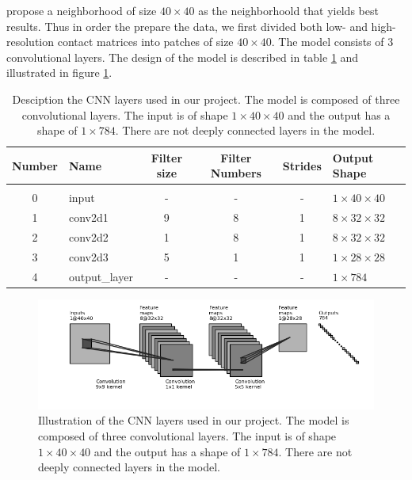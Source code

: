 \documentclass{article}
\begin{document}
propose a neighborhood of size $40 \times 40$
as the neighborhoold that yields best results.
Thus in order the prepare the data, we first
divided both low- and high-resolution contact
matrices into patches of size $40 \times 40$.
The model consists of 3 convolutional layers.
The design of the model is described in table
\ref{tab:modelDesign} and illustrated in 
figure \ref{fig:modelDesign}.
\begin{table}[]
    \centering
    \begin{tabular}{clcccl}
        Number   & Name           & Filter size & Filter Numbers & Strides & Output Shape \\[5pt] \hline \hline\\
        0        & input          &   -         &-               &    -    & $1\times40\times40$    \\[5pt]
        1        & conv2d1        & 9           & 8              & 1       & $8\times32\times32$    \\[5pt]
        2        & conv2d2        & 1           & 8              & 1       & $8\times32\times32$    \\[5pt]
        3        & conv2d3        & 5           & 1              & 1       & $1\times28\times28$    \\[5pt]
        4        & output\_layer  &     -       &   -            &   -     & $1\times784$     \\[30pt]
    \end{tabular}
    \caption{Desciption the CNN layers used in
    our project. The model is composed of three
    convolutional layers. The input is of shape
    $1\times40\times40$ and the output has a
    shape of $1\times784$. There are not deeply
    connected layers in the model.}
    \label{tab:modelDesign}
\end{table}
\begin{figure}[H]
    \centering
    \includegraphics[width=\textwidth]{model.jpg}
    \caption{Illustration of the CNN layers used in
    our project. The model is composed of three
    convolutional layers. The input is of shape
    $1\times40\times40$ and the output has a
    shape of $1\times784$. There are not deeply
    connected layers in the model.}
    \label{fig:modelDesign}
\end{figure}
\end{document}
